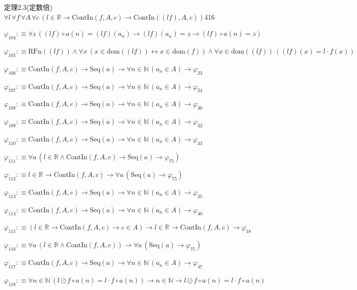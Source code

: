 \begin{fullproof}{定理2.3(定数倍)}{$\forall l\,\forall f\,\forall A\,\forall c\,(l \in \mathbb{R} \to \mathrm{ContIn}(f,A,c) \to \mathrm{ContIn}((l f),A,c))$}{416}
\begin{abbrevlist}
\item $\varphi_{104} :\equiv \forall z\,((l f) \circ a(n) = (l f)(a_{n}) \to (l f)(a_{n}) = z \to (l f) \circ a(n) = z)$
\item $\varphi_{105} :\equiv \mathrm{RFn}((l f)) \land \forall x\,(x \in \mathrm{dom}((l f)) \leftrightarrow x \in \mathrm{dom}(f)) \land \forall x \in \mathrm{dom}((l f))\,((l f)(x) = l \cdot f(x))$
\item $\varphi_{106} :\equiv \mathrm{ContIn}(f,A,c) \to \mathrm{Seq}(a) \to \forall n \in \mathbb{N}\,(a_{n} \in A) \to \varphi_{23}$
\item $\varphi_{107} :\equiv \mathrm{ContIn}(f,A,c) \to \mathrm{Seq}(a) \to \forall n \in \mathbb{N}\,(a_{n} \in A) \to \varphi_{24}$
\item $\varphi_{108} :\equiv \mathrm{ContIn}(f,A,c) \to \mathrm{Seq}(a) \to \forall n \in \mathbb{N}\,(a_{n} \in A) \to \varphi_{30}$
\item $\varphi_{109} :\equiv \mathrm{ContIn}(f,A,c) \to \mathrm{Seq}(a) \to \forall n \in \mathbb{N}\,(a_{n} \in A) \to \varphi_{32}$
\item $\varphi_{110} :\equiv \mathrm{ContIn}(f,A,c) \to \mathrm{Seq}(a) \to \forall n \in \mathbb{N}\,(a_{n} \in A) \to \varphi_{33}$
\item $\varphi_{111} :\equiv \forall a\,(l \in \mathbb{R} \land \mathrm{ContIn}(f,A,c) \to \mathrm{Seq}(a) \to \varphi_{75})$
\item $\varphi_{112} :\equiv l \in \mathbb{R} \to \mathrm{ContIn}(f,A,c) \to \forall a\,(\mathrm{Seq}(a) \to \varphi_{75})$
\item $\varphi_{113} :\equiv \mathrm{ContIn}(f,A,c) \to \mathrm{Seq}(a) \to \forall n \in \mathbb{N}\,(a_{n} \in A) \to \varphi_{35}$
\item $\varphi_{114} :\equiv \mathrm{ContIn}(f,A,c) \to \mathrm{Seq}(a) \to \forall n \in \mathbb{N}\,(a_{n} \in A) \to \varphi_{40}$
\item $\varphi_{115} :\equiv (l \in \mathbb{R} \to \mathrm{ContIn}(f,A,c) \to c \in A) \to l \in \mathbb{R} \to \mathrm{ContIn}(f,A,c) \to \varphi_{18}$
\item $\varphi_{116} :\equiv \forall a\,(l \in \mathbb{R} \land \mathrm{ContIn}(f,A,c)) \to \forall a\,(\mathrm{Seq}(a) \to \varphi_{75})$
\item $\varphi_{117} :\equiv \mathrm{ContIn}(f,A,c) \to \mathrm{Seq}(a) \to \forall n \in \mathbb{N}\,(a_{n} \in A) \to \varphi_{47}$
\item $\varphi_{118} :\equiv \forall n \in \mathbb{N}\,(l \odot f \circ a(n) = l \cdot f \circ a(n)) \to n \in \mathbb{N} \to l \odot f \circ a(n) = l \cdot f \circ a(n)$

\end{abbrevlist}
\end{fullproof}
